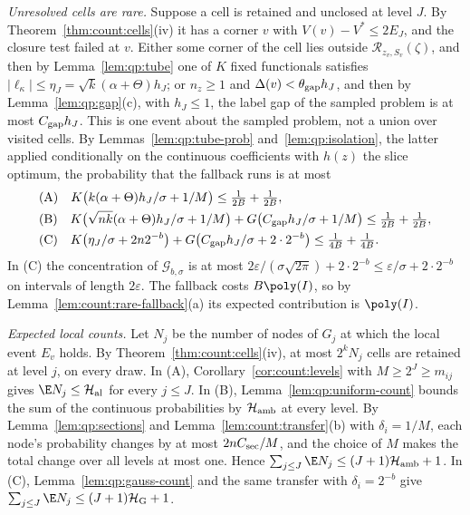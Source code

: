 \emph{Unresolved cells are rare.} Suppose a cell is retained and unclosed at
level $J$. By Theorem~\ref{thm:count:cells}(iv) it has a corner $v$ with
$V(v)-V^*\le2E_J$, and the closure test failed at $v$. Either some corner of the
cell lies outside $\mathcal R_{z_v,S_v}(\zeta)$, and then by
Lemma~\ref{lem:qp:tube} one of $K$ fixed functionals satisfies
$|\ell_\kappa|\le\eta_J=\sqrt k(\alpha+\Theta)h_J$; or $n_z\ge1$ and
$\Delta(v)<\theta_{\rm gap}h_J$, and then by Lemma~\ref{lem:qp:gap}(c), with
$h_J\le1$, the label gap of the sampled problem is at most $C_{\rm gap}h_J$.
This is one event about the sampled problem, not a union over visited cells.
By Lemmas~\ref{lem:qp:tube-prob} and~\ref{lem:qp:isolation}, the latter
applied conditionally on the continuous coefficients with $h(z)$ the slice
optimum, the probability that the fallback runs is at most
\[
 \begin{aligned}
 &\text{(A)}\quad K\bigl(k(\alpha+\Theta)h_J/\sigma+1/M\bigr)\le\tfrac1{2B}+\tfrac1{2B},\\
 &\text{(B)}\quad K\bigl(\sqrt{nk}(\alpha+\Theta)h_J/\sigma+1/M\bigr)+G\bigl(C_{\rm gap}h_J/\sigma+1/M\bigr)\le\tfrac1{2B}+\tfrac1{2B},\\
 &\text{(C)}\quad K\bigl(\eta_J/\sigma+2n2^{-b}\bigr)+G\bigl(C_{\rm gap}h_J/\sigma+2\cdot2^{-b}\bigr)\le\tfrac1{4B}+\tfrac1{4B}.
 \end{aligned}
\]
In (C) the concentration of $\mathcal G_{b,\sigma}$ is at most
$2\varepsilon/(\sigma\sqrt{2\pi})+2\cdot2^{-b}\le\varepsilon/\sigma+2\cdot2^{-b}$
on intervals of length $2\varepsilon$. The fallback costs
$B\poly(I)$, so by Lemma~\ref{lem:count:rare-fallback}(a) its expected
contribution is $\poly(I)$.

\emph{Expected local counts.} Let $N_j$ be the number of nodes of $G_j$ at which
the local event $E_v$ holds. By Theorem~\ref{thm:count:cells}(iv), at most
$2^kN_j$ cells are retained at level $j$, on every draw.
In (A), Corollary~\ref{cor:count:levels} with $M\ge2^J\ge m_{ij}$ gives
$\E N_j\le\mathcal H_{\rm al}$ for every $j\le J$.
In (B), Lemma~\ref{lem:qp:uniform-count} bounds the sum of the continuous
probabilities by $\mathcal H_{\rm amb}$ at every level. By
Lemma~\ref{lem:qp:sections} and Lemma~\ref{lem:count:transfer}(b) with
$\delta_i=1/M$, each node's probability changes by at most $2nC_{\rm sec}/M$,
and the choice of $M$ makes the total change over all levels at most one.
Hence $\sum_{j\le J}\E N_j\le(J+1)\mathcal H_{\rm amb}+1$.
In (C), Lemma~\ref{lem:qp:gauss-count} and the same transfer with
$\delta_i=2^{-b}$ give $\sum_{j\le J}\E N_j\le(J+1)\mathcal H_{\rm G}+1$.

